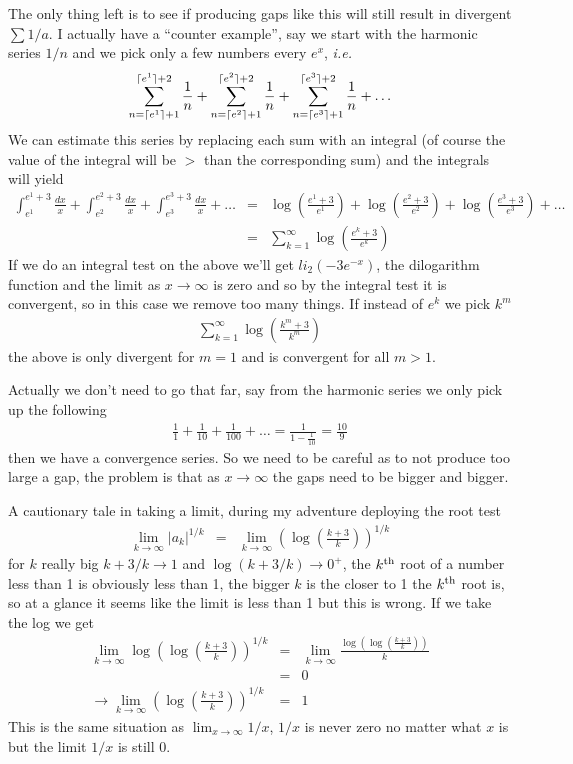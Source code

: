 \documentclass[aps,preprint,preprintnumbers,nofootinbib,showpacs,prd]{revtex4-1}
\newcommand{\ie}{{\it i.e.} }
\newcommand{\nbea}{\begin{eqnarray*}}
\newcommand{\neea}{\end{eqnarray*}}
\DeclarePairedDelimiter{\ceil}{\lceil}{\rceil}
\begin{document}
The only thing left is to see if producing gaps like this will still result in divergent $\sum 1/a$. I actually have a ``counter example'', say we start with the harmonic series $1/n$ and we pick only a few numbers every $e^x$, \ie 
%
\nbea
\sum_{n=\ceil{e^1}+1}^{\ceil{e^1}+2} \frac{1}{n} + \sum_{n=\ceil{e^2}+1}^{\ceil{e^2}+2} \frac{1}{n} + \sum_{n=\ceil{e^3}+1}^{\ceil{e^3}+2}\frac{1}{n} + \dots
\neea
%
We can estimate this series by replacing each sum with an integral (of course the value of the integral will be $>$ than the corresponding sum) and the integrals will yield
%
\nbea
\int_{e^1}^{e^1+3} \frac{dx}{x} + \int_{e^2}^{e^2+3} \frac{dx}{x} + \int_{e^3}^{e^3+3} \frac{dx}{x} + \dots & = & \log\left(\frac{e^1 + 3}{e^1}\right) + \log\left(\frac{e^2 + 3}{e^2}\right) + \log\left(\frac{e^3 + 3}{e^3}\right) + \dots \\
& = & \sum_{k = 1}^{\infty} \log \left(\frac{e^k+3}{e^k}\right)
\neea
%
If we do an integral test on the above we'll get ${{\mathit{li}}_{2}}\left(-3{{e}^{-x}}\right)$, the dilogarithm function and the limit as $x\to\infty$ is zero and so by the integral test it is convergent, so in this case we remove too many things. If instead of $e^k$ we pick $k^m$
%
\nbea
\sum_{k = 1}^{\infty} \log \left(\frac{k^{m}+3}{k^{m}}\right)
\neea
%
the above is only divergent for $m=1$ and is convergent for all $m > 1$.

Actually we don't need to go that far, say from the harmonic series we only pick up the following
%
\nbea
\frac{1}{1} + \frac{1}{10} + \frac{1}{100} + \dots = \frac{1}{1 - \frac{1}{10}} = \frac{10}{9}
\neea
%
then we have a convergence series. So we need to be careful as to not produce too large a gap, the problem is that as $x\to\infty$ the gaps need to be bigger and bigger.

A cautionary tale in taking a limit, during my adventure deploying the root test
%
\nbea
\lim_{k\to\infty} \left|a_k\right|^{1/k} & = & \lim_{k\to\infty} \left(\log\left(\frac{k+3}{k}\right)\right)^{1/k}
\neea 
%
for $k$ really big $k+3/k \to 1$ and $\log(k+3/k) \to 0^{+}$, the $k^{\rm th}$ root of a number less than 1 is obviously less than 1, the bigger $k$ is the closer to 1 the $k^{\rm th}$ root is, so at a glance it seems like the limit is less than 1 but this is wrong. If we take the log we get
%
\nbea
\lim_{k\to\infty} \log\left(\log\left(\frac{k+3}{k}\right)\right)^{1/k} & = & \lim_{k\to\infty} \frac{\log\left(\log\left(\frac{k+3}{k}\right)\right)}{k} \\
& = & 0 \\
\to \lim_{k\to\infty} \left(\log\left(\frac{k+3}{k}\right)\right)^{1/k} & = & 1
\neea
%
This is the same situation as $\lim_{x\to\infty} 1/x$, $1/x$ is never zero no matter what $x$ is but the limit $1/x$ is still 0.
\end{document}
